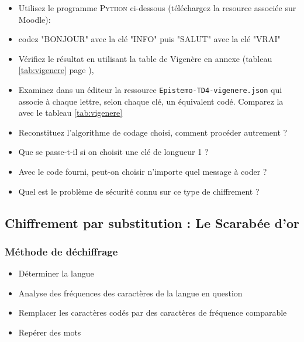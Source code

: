 \begin{itemize}
  \item Utilisez le programme \textsc{Python} ci-dessous (téléchargez la resource associée sur Moodle):

  \item  codez "BONJOUR" avec la clé "INFO" puis "SALUT" avec la clé "VRAI"
  \item Vérifiez le résultat en utilisant la table de Vigenère en annexe (tableau \ref{tab:vigenere} page \pageref{tab:vigenere}),
  \item Examinez dans un éditeur la ressource \texttt{Epistemo-TD4-vigenere.json} qui associe à chaque lettre, selon chaque clé, un équivalent codé. Comparez la avec le tableau  \ref{tab:vigenere}
  \item Reconstituez l'algorithme de codage choisi, comment procéder autrement ?
\item Que se passe-t-il si on choisit une clé de longueur 1 ?
\item Avec le code fourni, peut-on choisir n'importe quel message à coder ?
  \item Quel est le problème de sécurité connu sur ce type de chiffrement ?
\end{itemize}


\subsection{Chiffrement par substitution : Le Scarabée d'or}

\noindent{}

\subsubsection{Méthode de déchiffrage}

\begin{itemize}
  \item Déterminer la langue
  \item Analyse des fréquences des caractères de la langue en question
  \item Remplacer les caractères codés par des caractères de fréquence comparable
  \item Repérer des mots
\end{itemize}


